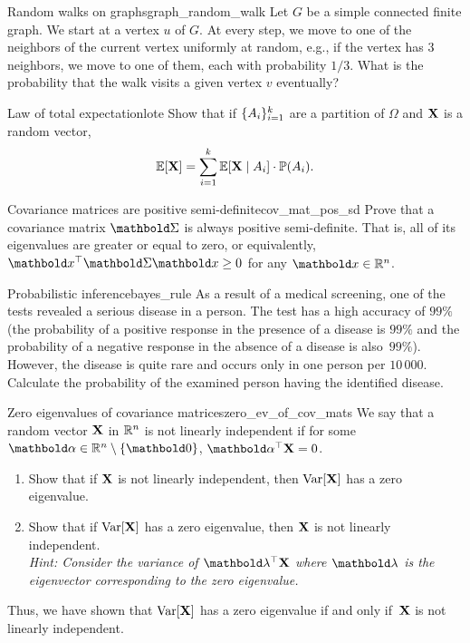 \begin{nexercise}{Random walks on graphs}{graph_random_walk}
  Let $G$ be a simple connected finite graph. We start at a vertex $u$ of $G$. At every step, we move to one of the neighbors of the current vertex uniformly at random, e.g., if the vertex has $3$ neighbors, we move to one of them, each with probability $1 / 3$. What is the probability that the walk visits a given vertex $v$ eventually?
\end{nexercise}

\begin{nexercise}{Law of total expectation}{lote}
  Show that if $\{A_i\}_{i=1}^k$ are a partition of $\Omega$ and $\mathbf{X}$ is a random vector, \begin{align}
    \E{\rX} = \sum_{i=1}^k \E{\rX \mid \sA_i} \cdot \Pr{\sA_i}.
  \end{align}
\end{nexercise}

\begin{nexercise}{Covariance matrices are positive semi-definite}{cov_mat_pos_sd}
  Prove that a covariance matrix $\mSigma$ is always positive semi-definite.
  That is, all of its eigenvalues are greater or equal to zero, or equivalently, $\transpose{\vx}\mSigma\vx \geq 0$ for any $\vx \in \R^n$.
\end{nexercise}

\begin{nexercise}{Probabilistic inference}{bayes_rule}
  As a result of a medical screening, one of the tests revealed a serious disease in a person.
  The test has a high accuracy of $99\%$ (the probability of a positive response in the presence of a disease is $99\%$ and the probability of a negative response in the absence of a disease is also~$99\%$).
  However, the disease is quite rare and occurs only in one person per $10\,000$.
  Calculate the probability of the examined person having the identified disease.
\end{nexercise}

\begin{nexercise}{Zero eigenvalues of covariance matrices}{zero_ev_of_cov_mats}
  We say that a random vector $\mathbf{X}$ in $\mathbb{R}^n$ is not linearly independent if for some $\valpha \in \R^n \setminus \{\vzero\}$, $\transpose{\valpha} \rX = 0$.
  \begin{enumerate}
    \item Show that if $\mathbf{X}$ is not linearly independent, then $\Var{\rX}$ has a zero eigenvalue.

    \item Show that if $\Var{\rX}$ has a zero eigenvalue, then $\mathbf{X}$ is not linearly independent. \\
    \textit{Hint: Consider the variance of $\transpose{\vlambda} \rX$ where $\vlambda$ is the eigenvector corresponding to the zero eigenvalue.}
  \end{enumerate}
  Thus, we have shown that $\Var{\rX}$ has a zero eigenvalue if and only if~$\mathbf{X}$ is not linearly independent.
\end{nexercise}

